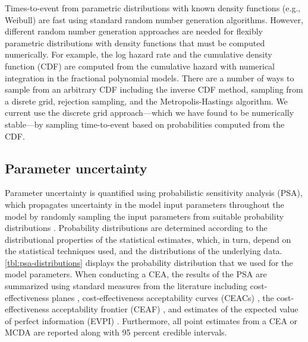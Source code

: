 \documentclass[11pt,final,fleqn]{article}\usepackage[]{graphicx}\usepackage[]{color}
\theoremstyle{plain}
\begin{document}
Times-to-event from parametric distributions with known density functions (e.g., Weibull) are fast using standard random number generation algorithms. However, different random number generation approaches are needed for flexibly parametric distributions with density functions that must be computed numerically. For example, the log hazard rate and the cumulative density function (CDF) are computed from the cumulative hazard with numerical integration in the fractional polynomial models. There are a number of ways to sample from an arbitrary CDF including the inverse CDF method, sampling from a disrete grid, rejection sampling, and the Metropolis-Hastings algorithm. We current use the discrete grid approach---which we have found to be numerically stable---by sampling time-to-event based on probabilities computed from the CDF.

\subsection{Parameter uncertainty} \label{subsec:psa}
Parameter uncertainty is quantified using probabilistic sensitivity analysis (PSA), which propagates uncertainty in the model input parameters throughout the model by randomly sampling the input parameters from suitable probability distributions \citep{baio2015probabilistic, claxton2005probabilistic}. Probability distributions are determined according to the distributional properties of the statistical estimates, which, in turn, depend on the statistical techniques used, and the distributions of the underlying data. \autoref{tbl:psa-distributions} displays the probability distribution that we used for the model parameters. When conducting a CEA, the results of the PSA are summarized using standard measures from the literature including cost-effectiveness planes \citep{black1990plane, barton2008optimal}, cost-effectiveness acceptability curves (CEACs) \citep{van1994costs, briggs1999bayesian, fenwick2001representing, barton2008optimal}, the cost-effectiveness acceptability frontier (CEAF) \citep{barton2008optimal}, and estimates of the expected value of perfect information (EVPI) \citep{fenwick2001representing, barton2008optimal}. Furthermore, all point estimates from a CEA or MCDA are reported along with 95 percent credible intervals. 
\end{document}
